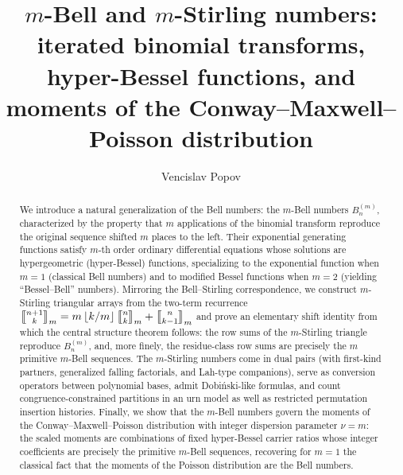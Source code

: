 \documentclass[a4paper]{amsart}
\title[$m$-Bell and $m$-Stirling numbers]{$m$-Bell and $m$-Stirling numbers: iterated binomial transforms, hyper-Bessel functions, and moments of the Conway--Maxwell--Poisson distribution}
\author{Vencislav Popov}
\date{}
\numberwithin{equation}{section}
\newcommand{\mStirling}[0]{\genfrac{\llbracket}{\rrbracket}{0pt}{}}
\newcommand{\floor}[1]{\left\lfloor #1 \right\rfloor}
\begin{document}
\begin{abstract}
We introduce a natural generalization of the Bell numbers: the $m$-Bell numbers $B^{(m)}_{n}$, characterized by the property that $m$ applications of the binomial transform reproduce the original sequence shifted $m$ places to the left. Their exponential generating functions satisfy $m$-th order ordinary differential equations whose solutions are hypergeometric (hyper-Bessel) functions, specializing to the exponential function when $m=1$ (classical Bell numbers) and to modified Bessel functions when $m=2$ (yielding ``Bessel--Bell'' numbers). Mirroring the Bell--Stirling correspondence, we construct $m$-Stirling triangular arrays from the two-term recurrence $\mStirling{n+1}{k}_m=m\floor{k/m}\mStirling{n}{k}_m+\mStirling{n}{k-1}_m$ and prove an elementary shift identity from which the central structure theorem follows: the row sums of the $m$-Stirling triangle reproduce $B^{(m)}_{n}$, and, more finely, the residue-class row sums are precisely the $m$ primitive $m$-Bell sequences. The $m$-Stirling numbers come in dual pairs (with first-kind partners, generalized falling factorials, and Lah-type companions), serve as conversion operators between polynomial bases, admit Dobi\'nski-like formulas, and count congruence-constrained partitions in an urn model as well as restricted permutation insertion histories. Finally, we show that the $m$-Bell numbers govern the moments of the Conway--Maxwell--Poisson distribution with integer dispersion parameter $\nu=m$: the scaled moments are combinations of fixed hyper-Bessel carrier ratios whose integer coefficients are precisely the primitive $m$-Bell sequences, recovering for $m=1$ the classical fact that the moments of the Poisson distribution are the Bell numbers.
\end{abstract}


\maketitle
\end{document}
